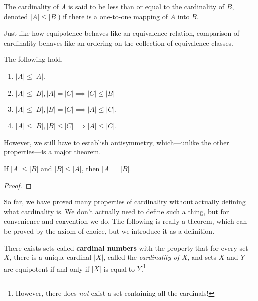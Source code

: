   \begin{definition}
    The cardinality of $A$ is said to be less than or equal to the cardinality of $B$, denoted $|A| \leq |B|$) if there is a one-to-one mapping of $A$ into $B$. 
  \end{definition} 

  Just like how equipotence behaves like an equivalence relation, comparison of cardinality behaves like an ordering on the collection of equivalence classes. 

  \begin{theorem}
    The following hold. 
    \begin{enumerate}
      \item $|A| \leq |A|$. 
      \item $|A| \leq |B|, |A| = |C| \implies |C| \leq |B|$ 
      \item $|A| \leq |B|, |B| = |C| \implies |A| \leq |C|$. 
      \item $|A| \leq |B|, |B| \leq |C| \implies |A| \leq |C|$. 
    \end{enumerate}
  \end{theorem}

  However, we still have to establish antisymmetry, which---unlike the other properties---is a major theorem. 

  \begin{theorem}
    If $|A| \leq |B|$ and $|B| \leq |A|$, then $|A| = |B|$. 
  \end{theorem}
  \begin{proof}
    
  \end{proof} 

  So far, we have proved many properties of cardinality without actually defining what cardinality is. We don't actually need to define such a thing, but for convenience and convention we do. The following is really a theorem, which can be proved by the axiom of choice, but we introduce it as a definition. 

  \begin{definition}
    There exists sets called \textbf{cardinal numbers} with the property that for every set $X$, there is a unique cardinal $|X|$, called the \textit{cardinality of $X$}, and sets $X$ and $Y$ are equipotent if and only if $|X|$ is equal to $Y$.\footnote{However, there does \textit{not} exist a set containing all the cardinals!}
  \end{definition} 

